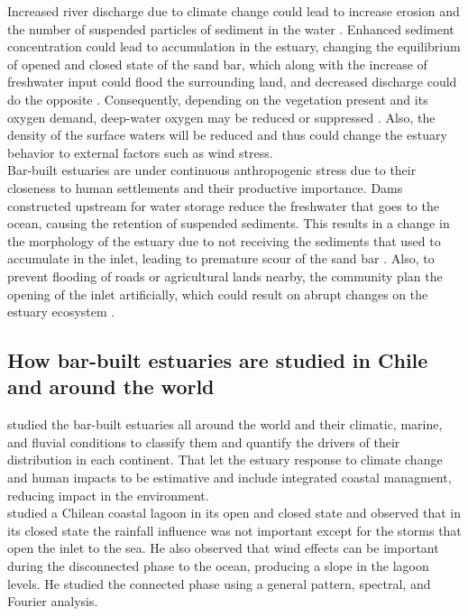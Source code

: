 \documentclass[tesis.tex]{subfiles}
\begin{document}
Increased river discharge due to climate change could lead to increase erosion and the number of suspended particles of sediment in the water \citep{whitfield1994changes}. Enhanced sediment concentration could lead to accumulation in the estuary, changing the equilibrium of opened and closed state of the sand bar, which along with the increase of freshwater input could flood the surrounding land, and decreased discharge could do the opposite \citep{peeters2009currents}. Consequently, depending on the vegetation present and its oxygen demand, deep-water oxygen may be reduced or suppressed \citep{Kelly2018, Largier2021}. Also, the density of the surface waters will be reduced and thus could change the estuary behavior to external factors such as wind stress. \\

Bar-built estuaries are under continuous anthropogenic stress due to their closeness to human settlements \citep{clark2019systematic} and their productive importance. Dams constructed upstream for water storage reduce the freshwater that goes to the ocean, causing the retention of suspended sediments. This results in a change in the morphology of the estuary due to not receiving the sediments that used to accumulate in the inlet, leading to premature scour of the sand bar \citep{peeters2009currents}. Also, to prevent flooding of roads or agricultural lands nearby, the community plan the opening of the inlet artificially, which could result on abrupt changes on the estuary ecosystem \cite{Behrens2013}. \\

\subsection{How bar-built estuaries are studied in Chile and around the world}

\cite{mcsweeney2017intermittently} studied the bar-built estuaries all around the world and their climatic, marine, and fluvial conditions to classify them and quantify the drivers of their distribution in each continent. That let the estuary response to climate change and human impacts to be estimative and include integrated coastal managment, reducing impact in the environment.\\

\cite{dussaillant2009} studied a Chilean coastal lagoon in its open and closed state and observed that in its closed state the rainfall influence was not important except for the storms that open the inlet to the sea. He also observed that wind effects can be important during the disconnected phase to the ocean, producing a slope in the lagoon levels. He studied the connected phase using a general pattern, spectral, and Fourier analysis.\\
\end{document}
